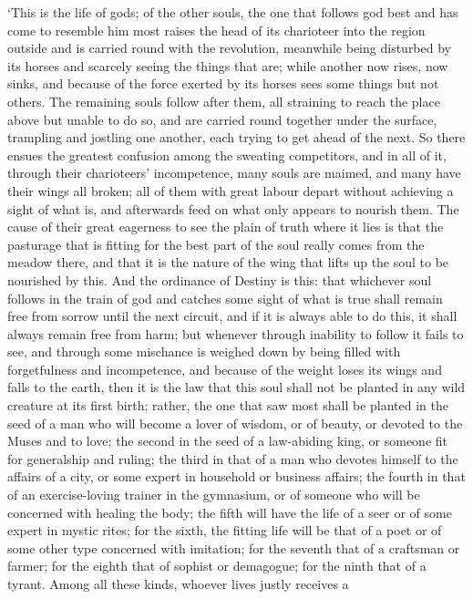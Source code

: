  ‘This is the life of gods; of the other souls, the one that
follows god best and has come to resemble him most raises the head of
its charioteer into the region outside and is carried round with the
revolution, meanwhile being disturbed by its  horses and
scarcely seeing the things that are; while another now rises, now sinks,
and because of the force exerted by its horses sees some things but not
others. The remaining souls follow after them, all straining to reach
the place above but unable to do so, and are carried round together
under the  surface, trampling and jostling one another, each
trying to get ahead of the next. So there ensues the greatest confusion
among the sweating competitors, and in all of it, through their
charioteers' incompetence, many souls are maimed, and many have their
wings all broken; all of them with great labour depart  without
achieving a sight of what is, and afterwards feed on what only appears
to nourish them. The
cause of their great eagerness to see the plain of truth where it lies
is that the  pasturage that is fitting for the best part of the
soul really comes from
the meadow there, and that it is the nature of the wing that lifts up
the soul to be nourished by this. And the ordinance of
Destiny is this: that
whichever soul follows in the train of god and catches some sight of
what is true shall  remain free from sorrow until the next
circuit, and if it is always able to do this, it shall always remain
free from harm; but whenever through inability to follow it fails to
see, and through some mischance is weighed down by being filled with
forgetfulness and incompetence, and because of the weight loses its
wings and falls to the earth, then it is the law that this soul shall
not be planted in any wild creature at its first
birth; rather, 
the one that saw most shall be planted in the seed of a man who will
become a lover of wisdom, or of beauty, or devoted to the Muses and to
love; the second in the
seed of a law-abiding king, or someone fit for generalship and ruling;
the  third in that of a man who devotes himself to the affairs
of a city, or some expert in household or business affairs; the fourth
in that of an exercise-loving trainer in the gymnasium, or of someone
who will be concerned with healing the body; the fifth will have the
life of a seer or of some expert in mystic rites; for  the
sixth, the fitting life will be that of a
poet or of some other
type concerned with imitation; for the seventh that of a craftsman or
farmer; for the eighth that of sophist or demagogue; for the ninth that
of a tyrant. Among all these kinds, whoever lives justly receives a

